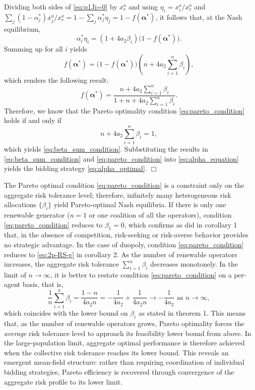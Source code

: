 \documentclass[conference]{IEEEtran}
\begin{document}
Dividing both sides of \eqref{eq:p1Ji=0} by $x_r^o$ and using $\eta_i = x_i^o/x_r^o$ and $\sum_j(1-\alpha_j^*)x_j^o/x_r^o = 1 - \sum_j\alpha_j^*\eta_j = 1-f(\boldsymbol{\alpha}^*)$, it follows that, at the Nash equilibrium,
\begin{equation}
    \alpha_i^* \eta_i
= (1+4a_2\beta_i)\bigl(1-f(\boldsymbol{\alpha}^\ast)\bigr). \label{eq:alpha_equation}
\end{equation}
Summing up for all $i$ yields
\[ f(\boldsymbol{\alpha}^\ast)
= \bigl(1-f(\boldsymbol{\alpha}^\ast)\bigr)
\left(n + 4a_2\sum_{i=1}^n \beta_i\right),
\]
which renders the following result:
\[
f(\boldsymbol{\alpha}^\ast)
= \frac{n + 4a_2\sum_{i=1}^n \beta_i}{1 + n + 4a_2\sum_{i=1}^n \beta_i}.
\]
Therefore, we know that the Pareto optimality condition \eqref{eq:pareto_condition} holds if and
only if
\[
n + 4a_2\sum_{i=1}^n \beta_i = 1,
\]
which yields \eqref{eq:beta_sum_condition}. Subbstituting the results in \eqref{eq:beta_sum_condition} and \eqref{eq:pareto_condition} into \eqref{eq:alpha_equation} yields the bidding strategy \eqref{eq:alpha_optimal}.
\hfill$\Box$

The Pareto optimal condition \eqref{eq:pareto_condition} is a constraint only on the aggregate risk tolerance level; therefore, infinitely many heterogeneous risk allocations $\{\beta_i\}$ yield Pareto-optimal Nash equilibria.
If there is only one renewable generator ($n=1$ or one coalition of all the operators), condition \eqref{eq:pareto_condition} reduces to $\beta_1 = 0$,
which confirms as did in corollary 1 that, in the absence of competition, risk-seeking or risk-averse behavior provides no strategic advantage. In the case of duopoly, condition \eqref{eq:pareto_condition} reduces to \eqref{eq:2p-RS-g} in corollary 2. As the number of renewable operators increases, the aggregate risk tolerance $\sum_{i=1}^n \beta_i$ decreases monotonely. In the limit of $n\to\infty$, it is better to restate condition \eqref{eq:pareto_condition} on a per-agent basis, that is, 
\[
\frac{1}{n}\sum_{i=1}^n \beta_i
= \frac{1-n}{4a_2 n}
= -\frac{1}{4a_2} + \frac{1}{4a_2 n} \to 
 -\frac{1}{4a_2} \mbox{ as } n\to\infty, 
\]
which coincides with the lower bound on $\beta_i$ as stated in theorem 1. 
This means that, as the number of renewable operators grows,
Pareto optimality forces the \emph{average} risk tolerance level to approach
its feasibility lower bound from above. In the large-population limit,
aggregate optimal performance is therefore achieved when the collective
risk tolerance reaches its lower bound. This reveals an emergent mean-field structure: rather than requiring coordination of individual bidding strategies, Pareto efficiency is recovered through convergence of the aggregate risk profile to its lower limit.
\end{document}
